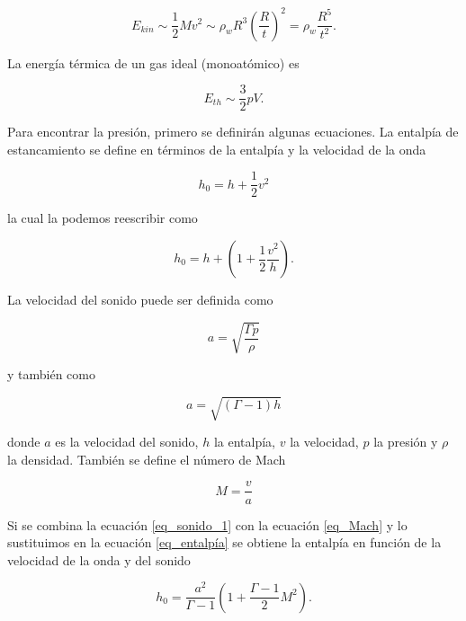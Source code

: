 \documentclass[12pt,a4paper]{book}
\begin{document}
\begin{equation}
	E_{kin} \sim \frac{1}{2} M v^2 \sim \rho_w R^3 \left( \frac{R}{t} \right) ^2 = \rho_w \frac{R^5}{t^2}.
\end{equation}

\noindent La energía térmica de un gas ideal (monoatómico) es 

\begin{equation} \label{eq_energia_termica}
	E_{th} \sim \frac{3}{2}pV.
\end{equation}

\noindent Para encontrar la presión, primero se definirán algunas ecuaciones. La entalpía de estancamiento se define en términos de la entalpía y la velocidad de la onda 

\begin{equation}
	h_0 = h + \frac{1}{2} v^2
\end{equation}

\noindent la cual la podemos reescribir como

\begin{equation} \label{eq_entalpía}
	h_0 = h + \left( 1 +\frac{1}{2} \frac{v^2}{h} \right).
\end{equation}

\noindent La velocidad del sonido puede ser definida como 

\begin{equation} \label{eq_sonido_1}
	a = \sqrt{\frac{\Gamma p}{\rho}}
\end{equation}

\noindent y también como 

\begin{equation} \label{eq_sonido_2}
	a = \sqrt{(\Gamma-1) h}
\end{equation}

\noindent donde $a$ es la velocidad del sonido, $h$ la entalpía, $v$ la velocidad, $p$ la presión y $\rho$ la densidad. También se define el número de Mach 

\begin{equation} \label{eq_Mach}
	M = \frac{v}{a}
\end{equation}

Si se combina la ecuación \ref{eq_sonido_1} con la ecuación \ref{eq_Mach} y lo sustituimos en la ecuación \ref{eq_entalpía} se obtiene la entalpía en función de la velocidad de la onda y del sonido

\begin{equation} \label{h_0_función_aire_mach}
	h_0 = \frac{a^2}{\Gamma - 1} \left( 1 + \frac{\Gamma - 1}{2} M^2 \right).
\end{equation}
\end{document}
